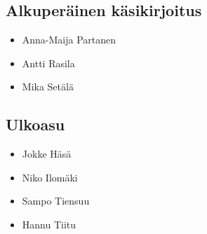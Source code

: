 \subsection*{Alkuperäinen käsikirjoitus}
\begin{itemize}
\item Anna-Maija Partanen
\item Antti Rasila
\item Mika Setälä
\end{itemize}

\subsection*{Ulkoasu}
\begin{itemize}
\item Jokke Häsä
\item Niko Ilomäki
\item Sampo Tiensuu
\item Hannu Tiitu
\end{itemize}
